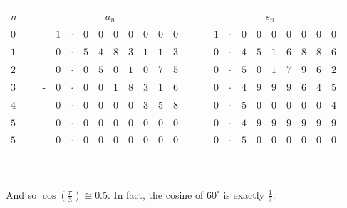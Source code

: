\documentclass[11pt,a4paper,titlepage,oneside,openany]{article}
\begin{document}
\begin{tabular}{|l|c|cp{0.1em}p{0.1em}p{0.1em}p{0.1em}p{0.1em}p{0.1em}p{0.1em}p{0.1em}p{0.1em}|c|p{0.1em}p{0.1em}p{0.1em}p{0.1em}p{0.1em}p{0.1em}p{0.1em}p{0.1em}p{0.1em}p{0.1em}|}\hline
$n$ & \ & \multicolumn{10}{c|}{$a_n$} & \ & \multicolumn{10}{c|}{$s_n$} \\\hline
$0$ & \ &
\hspace{0.4em} & $1$ & $\cdot$ & $0$ & $0$ & $0$ & $0$ & $0$ & $0$ & $0$  & \ &
\hspace{0.4em} & $1$ & $\cdot$ & $0$ & $0$ & $0$ & $0$ & $0$ & $0$ & $0$  \\ \hline
$1$ & \ &
- & $0$ & $\cdot$ & $5$ & $4$ & $8$ & $3$ & $1$ & $1$ & $3$  & \ &
\hspace{0.4em} & $0$ & $\cdot$ & $4$ & $5$ & $1$ & $6$ & $8$ & $8$ & $6$  \\ \hline
$2$ & \ &
\hspace{0.4em} & $0$ & $\cdot$ & $0$ & $5$ & $0$ & $1$ & $0$ & $7$ & $5$  & \ &
\hspace{0.4em} & $0$ & $\cdot$ & $5$ & $0$ & $1$ & $7$ & $9$ & $6$ & $2$  \\ \hline
$3$ & \ &
- & $0$ & $\cdot$ & $0$ & $0$ & $1$ & $8$ & $3$ & $1$ & $6$  & \ &
\hspace{0.4em} & $0$ & $\cdot$ & $4$ & $9$ & $9$ & $9$ & $6$ & $4$ & $5$  \\ \hline
$4$ & \ &
\hspace{0.4em} & $0$ & $\cdot$ & $0$ & $0$ & $0$ & $0$ & $3$ & $5$ & $8$  & \ &
\hspace{0.4em} & $0$ & $\cdot$ & $5$ & $0$ & $0$ & $0$ & $0$ & $0$ & $4$  \\ \hline
$5$ & \ &
- & $0$ & $\cdot$ & $0$ & $0$ & $0$ & $0$ & $0$ & $0$ & $0$  & \ &
\hspace{0.4em} & $0$ & $\cdot$ & $4$ & $9$ & $9$ & $9$ & $9$ & $9$ & $9$  \\ \hline
$5$ & \ &
\hspace{0.4em} & $0$ & $\cdot$ & $0$ & $0$ & $0$ & $0$ & $0$ & $0$ & $0$  & \ &
\hspace{0.4em} & $0$ & $\cdot$ & $5$ & $0$ & $0$ & $0$ & $0$ & $0$ & $0$  \\ \hline
\end{tabular}
\\
\\
And so $\cos(\frac{\pi}{3}) \cong 0.5$. In fact, the cosine of $60^\circ$ is exactly $\frac{1}{2}$.
\end{document}
